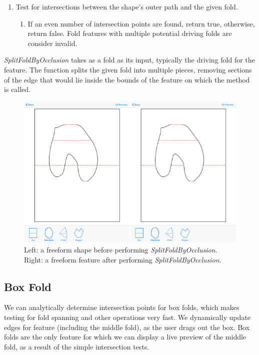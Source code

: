 \begin{enumerate}
\def\labelenumi{\arabic{enumi})}
\itemsep1pt\parskip0pt
\item
  Test for intersections between the shape's outer path and the given
  fold.

  \begin{enumerate}
  \def\labelenumii{(\alph{enumii})}
  \itemsep1pt\parskip0pt
  \item
    If an even number of intersection points are found, return true,
    otherwise, return false. Fold features with multiple potential
    driving folds are consider invalid.
  \end{enumerate}
\end{enumerate}

\emph{SplitFoldByOcclusion} takes as a fold as its input, typically the
driving fold for the feature. The function splits the given fold into
multiple pieces, removing sections of the edge that would lie inside the
bounds of the feature on which the method is called.

\begin{figure}[htbp]
\centering
\includegraphics{figures/41_Tech_Tool_Implementation/splitfoldbyOcclusionBeforeAfter.pdf}
\caption{Left: a freeform shape before performing
\emph{SplitFoldByOcclusion}. Right: a freeform feature after performing
\emph{SplitFoldByOcclusion}.}
\end{figure}

\subsection{Box Fold}\label{box-fold}

We can analytically determine intersection points for box folds, which
makes testing for fold spanning and other operations very fast. We
dynamically update edges for feature (including the middle fold), as the
user drags out the box. Box folds are the only feature for which we can
display a live preview of the middle fold, as a result of the simple
intersection tests.

